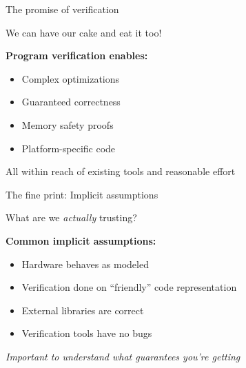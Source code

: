 \documentclass[aspectratio=169, lualatex, handout]{beamer}
\begin{document}
\begin{frame}{The promise of verification}
	\begin{center}
		\Large
		We can have our cake and eat it too!
	\end{center}
	\vspace{1em}
	\textbf{Program verification enables:}
	\begin{itemize}
		\item Complex optimizations
		\item Guaranteed correctness
		\item Memory safety proofs
		\item Platform-specific code
	\end{itemize}
	\vspace{0.5em}
	\begin{center}
		All within reach of existing tools and reasonable effort
	\end{center}
\end{frame}

\begin{frame}{The fine print: Implicit assumptions}
	\begin{center}
		\Large
		What are we \textit{actually} trusting?
	\end{center}
	\vspace{1em}
	\textbf{Common implicit assumptions:}
	\begin{itemize}
		\item Hardware behaves as modeled
		\item Verification done on ``friendly'' code representation
		\item External libraries are correct
		\item Verification tools have no bugs
	\end{itemize}
	\vspace{0.5em}
	\begin{center}
		\textit{Important to understand what guarantees you're getting}
	\end{center}
\end{frame}
\end{document}

